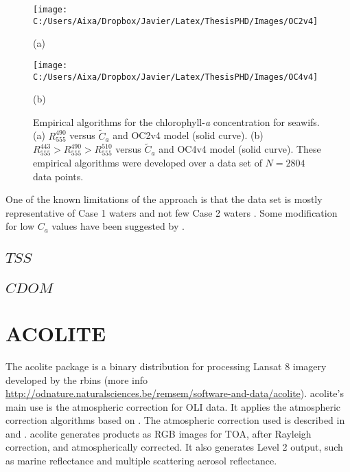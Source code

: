 \begin{figure}[htb]
  \begin{minipage}[c]{0.48\linewidth}
    \centering
      \texttt{[image: C:/Users/Aixa/Dropbox/Javier/Latex/ThesisPHD/Images/OC2v4]}  
    \centerline{(a)}\medskip
  \end{minipage}
  \hfill
  \begin{minipage}[d]{0.48\linewidth}
    \centering
      \texttt{[image: C:/Users/Aixa/Dropbox/Javier/Latex/ThesisPHD/Images/OC4v4]}
    \centerline{(b)}\medskip
  \end{minipage}
  \caption{Empirical algorithms for the chlorophyll-{\it a} concentration for \gls{seawifs}. (a) $R_{555}^{490}$ versus $\tilde{C}_a$ and OC2v4 model (solid curve). (b) $R_{555}^{443}>R_{555}^{490}>R_{555}^{510}$ versus $\tilde{C}_a$ and OC4v4 model (solid curve). These empirical algorithms were developed over a data set of $N=2804$ data points. \label{fig:chlemp} } 
\end{figure}

One of the known limitations of the approach is that the data set is mostly representative of Case 1 waters and not few Case 2 waters \cite{OReilly2000}. Some modification for low $C_a$ values have been suggested by \cite{Hu:2012fv}.

\subsection{$TSS$}
\subsection{$CDOM$}

\section{ACOLITE}
\label{subsec:acolite}

The \gls{acolite} package is a binary distribution for processing Lansat 8 imagery developed by the \gls{rbins} (more info \url{http://odnature.naturalsciences.be/remsem/software-and-data/acolite}). \gls{acolite}'s main use is the atmospheric correction for OLI data. It applies the atmospheric correction algorithms based on \cite{Gordon:1994}. The atmospheric correction used is described in \cite{Vanhellemont2014} and \cite{Vanhellemont:2015}. \gls{acolite} generates products as RGB images for TOA, after Rayleigh correction, and atmospherically corrected. It also generates Level 2 output, such as marine reflectance and multiple scattering aerosol reflectance.



